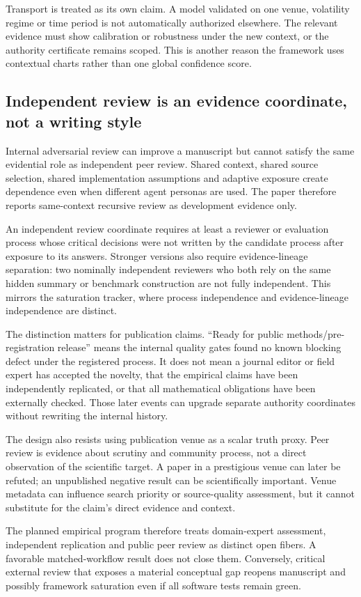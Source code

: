 Transport is treated as its own claim. A model validated on one venue, volatility regime or time period is not automatically authorized elsewhere. The relevant evidence must show calibration or robustness under the new context, or the authority certificate remains scoped. This is another reason the framework uses contextual charts rather than one global confidence score.

\subsection{Independent review is an evidence coordinate, not a writing style}

Internal adversarial review can improve a manuscript but cannot satisfy the same evidential role as independent peer review. Shared context, shared source selection, shared implementation assumptions and adaptive exposure create dependence even when different agent personas are used. The paper therefore reports same-context recursive review as development evidence only.

An independent review coordinate requires at least a reviewer or evaluation process whose critical decisions were not written by the candidate process after exposure to its answers. Stronger versions also require evidence-lineage separation: two nominally independent reviewers who both rely on the same hidden summary or benchmark construction are not fully independent. This mirrors the saturation tracker, where process independence and evidence-lineage independence are distinct.

The distinction matters for publication claims. ``Ready for public methods/pre-registration release'' means the internal quality gates found no known blocking defect under the registered process. It does not mean a journal editor or field expert has accepted the novelty, that the empirical claims have been independently replicated, or that all mathematical obligations have been externally checked. Those later events can upgrade separate authority coordinates without rewriting the internal history.

The design also resists using publication venue as a scalar truth proxy. Peer review is evidence about scrutiny and community process, not a direct observation of the scientific target. A paper in a prestigious venue can later be refuted; an unpublished negative result can be scientifically important. Venue metadata can influence search priority or source-quality assessment, but it cannot substitute for the claim's direct evidence and context.

The planned empirical program therefore treats domain-expert assessment, independent replication and public peer review as distinct open fibers. A favorable matched-workflow result does not close them. Conversely, critical external review that exposes a material conceptual gap reopens manuscript and possibly framework saturation even if all software tests remain green.

